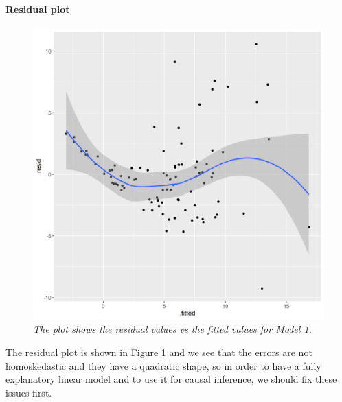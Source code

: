 \documentclass{article}
\begin{document}
	\paragraph{Residual plot}
	\begin{figure} 
		\centering
		\includegraphics[width=1\linewidth]{residuals_mod1.png}
		\caption{\textit{The plot shows the residual values vs the fitted values for Model 1.}}
		\label{fig:residuals_mod1}
	\end{figure}
	The residual plot is shown in Figure \ref{fig:residuals_mod1} and we see that the errors are not homoskedastic and they have a quadratic shape, so in order to have a fully explanatory linear model and to use it for causal inference, we should fix these issues first.
	
\end{document}
